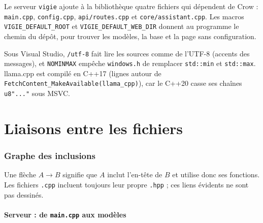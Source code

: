 \documentclass[11pt,a4paper]{article}
\newcommand{\fichier}[1]{\texttt{#1}}
\begin{document}
Le serveur \fichier{vigie} ajoute à la bibliothèque quatre fichiers qui dépendent de Crow : \fichier{main.cpp}, \fichier{config.cpp}, \fichier{api/routes.cpp} et \fichier{core/assistant.cpp}. Les macros \texttt{VIGIE\_DEFAULT\_ROOT} et \texttt{VIGIE\_DEFAULT\_WEB\_DIR} donnent au programme le chemin du dépôt, pour trouver les modèles, la base et la page sans configuration.


Sous Visual Studio, \texttt{/utf-8} fait lire les sources comme de l'UTF-8 (accents des messages), et \texttt{NOMINMAX} empêche \texttt{windows.h} de remplacer \texttt{std::min} et \texttt{std::max}. llama.cpp est compilé en C++17 (lignes autour de \texttt{FetchContent\_MakeAvailable(llama\_cpp)}), car le C++20 casse ses chaînes \texttt{u8"..."} sous MSVC.

\part{Liaisons entre les fichiers}

\section{Graphe des inclusions}

Une flèche \(A \rightarrow B\) signifie que \(A\) inclut l'en-tête de \(B\) et utilise donc ses fonctions. Les fichiers \texttt{.cpp} incluent toujours leur propre \texttt{.hpp} ; ces liens évidents ne sont pas dessinés.

\subsection{Serveur : de \texttt{main.cpp} aux modèles}
\end{document}
